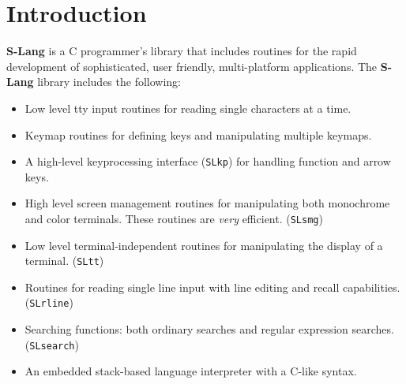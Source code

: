
\setlength{\oddsidemargin}{0mm}
\setlength{\evensidemargin}{0mm}
\setlength{\textwidth}{160mm}
\setlength{\topmargin}{-10mm}
\setlength{\textheight}{210mm}
\parindent=0mm
\parskip=5mm

\def\mytitle{S-Lang C Programmer's Guide}

\newlength{\pagewidth}
\setlength{\pagewidth}{\textwidth}

\makeatletter
\def\ps@headings{\def\@oddfoot{}%
\def\@oddhead{\makebox[\textwidth][l]{\underline{\hbox to \pagewidth{\bf
\mytitle\hfill\thepage}}}}%
\def\@evenfoot{}%
\def\@evenhead{\makebox[\textwidth][l]{\underline{\hbox to \pagewidth{\bf
\mytitle\hfill\thepage}}}}}%
\pagestyle{headings}



\newcommand{\slang}{{\bf S-Lang}}
\newcommand{\jed}{{\bf jed}}

\newcommand{\grp}[1]{{\bf #1}}
\newcommand{\exmp}[1]{{\tt #1}}
\newcommand{\var}[1]{{\tt #1}}
\newcommand{\key}[1]{{\sc #1}}
\newcommand{\file}[1]{{\tt #1}}



\tableofcontents
\pagebreak

\section{Introduction} %

  \slang{} is a C programmer's library that includes routines for the rapid
  development of sophisticated, user friendly, multi-platform applications.
  The \slang{} library includes the following:

\begin{itemize} 
\item  Low level tty input routines for reading single characters at a time.
\item  Keymap routines for defining keys and manipulating multiple keymaps.
\item  A high-level keyprocessing interface (\verb|SLkp|) for
       handling function and arrow keys.
\item  High level screen management routines for manipulating both
       monochrome and color terminals.  These routines are {\em very}
       efficient. ({\tt SLsmg})
\item  Low level terminal-independent routines for manipulating the display
       of a terminal. ({\tt SLtt})
\item  Routines for reading single line input with line editing and recall
       capabilities. ({\tt SLrline})
\item  Searching functions: both ordinary searches and regular expression
       searches. ({\tt SLsearch})
\item  An embedded stack-based language interpreter with a C-like syntax.
\end{itemize} 


